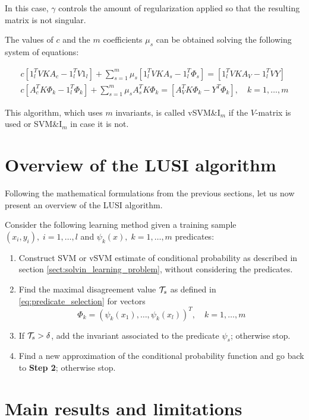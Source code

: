 In this case, $\gamma$ controls the amount of regularization applied so that the resulting matrix is not singular.

The values of $c$ and the $m$ coefficients $\mu_s$ can be obtained solving the following system of equations:

\begin{equation*}
    \begin{gathered}
        c [1_l^T VKA_c - 1_l^T V 1_l] + \sum_{s=1}^m \mu_s [1_l^T VKA_s - 1_l^T \Phi_s] = [1_l^T VKA_V - 1_l^T V Y] \\
        c [A_c^TK\Phi_k - 1_l^T\Phi_k] + \sum_{s=1}^m \mu_s A_s^T K \Phi_k = [A_V^T K \Phi_k - Y^T \Phi_k],\quad k=1, \dots, m
    \end{gathered}
\end{equation*}

This algorithm, which uses $m$ invariants, is called vSVM\&$\text{I}_m$ if the $V$-matrix is used
or SVM\&$\text{I}_m$ in case it is not.

\section{Overview of the LUSI algorithm}

Following the mathematical formulations from the previous sections, let us now present an overview of
the LUSI algorithm.

Consider the following learning method given a training sample $(x_i, y_i),\; i=1, \dots, l$ and
$\psi_k(x),\; k=1, \dots, m$ predicates:

\begin{enumerate}[label=\textbf{Step \arabic*:}]
    \item Construct SVM or vSVM estimate of conditional probability as described in section
    \ref{sect:solvin_learning_problem}, without considering the predicates.
    \item Find the maximal disagreement value $\mathcal{T}_s$ as defined in \eqref{eq:predicate_selection}
    for vectors
    \[
        \Phi_k = (\psi_k(x_1), \dots, \psi_k(x_l))^T,\quad k=1, \dots, m
    \]
    \item If $\mathcal{T}_s > \delta$, add the invariant associated to the predicate $\psi_s$; otherwise stop.
    \item Find a new approximation of the conditional probability function and go back to \textbf{Step 2};
    otherwise stop.
\end{enumerate}

\section{Main results and limitations}

